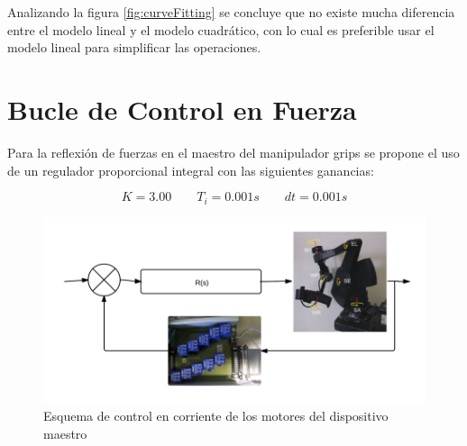 Analizando la figura \ref{fig:curveFitting} se concluye que no existe mucha diferencia entre el modelo lineal y el modelo cuadrático, con lo cual es preferible usar el modelo lineal para simplificar las operaciones.



\section{Bucle de Control en Fuerza}

Para la reflexión de fuerzas en el maestro del manipulador grips se propone el uso de un regulador proporcional integral con las siguientes ganancias:

\begin{equation}
K=3.00 \qquad    T_i=0.001s \qquad   dt=0.001s
\end{equation}



\begin{figure}[htb!]
\centering
\caption{Esquema de control en corriente de los motores del dispositivo maestro}
\includegraphics[scale=0.5]{FiguresP/Controller}
\end{figure}




